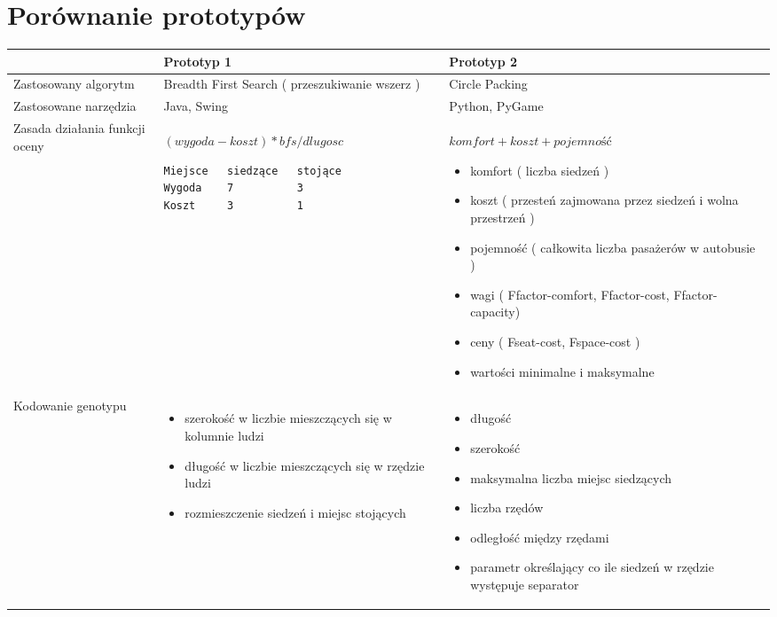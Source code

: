 \documentclass[bibtotocnumbered, headsepline,normalheadings,12pt,polish]{scrreprt}
\begin{document}
\chapter*{Porównanie prototypów}
\begin{tabular}{| p{3cm} || p{6cm} | p{6cm} |}
\hline
 & Prototyp 1 & Prototyp 2 \\
\hline
\hline
Zastosowany algorytm & Breadth First Search ( przeszukiwanie wszerz ) & Circle Packing \\
\hline
Zastosowane narzędzia & Java, Swing & Python, PyGame \\
\hline

Zasada działania funkcji oceny &
$ (wygoda-koszt)*bfs/dlugosc $
\begin{verbatim}
Miejsce   siedzące   stojące
Wygoda    7          3
Koszt     3          1
\end{verbatim}
&
$ komfort + koszt + pojemność $
\begin{itemize}
\item komfort ( liczba siedzeń )
\item koszt ( przesteń zajmowana przez siedzeń i wolna przestrzeń )
\item pojemność ( całkowita liczba pasażerów w autobusie )
\item wagi  ( Ffactor-comfort, Ffactor-cost, Ffactor-capacity)
\item ceny ( Fseat-cost, Fspace-cost )
\item wartości minimalne i maksymalne
\end{itemize}
\\
\hline
Kodowanie genotypu & \begin{itemize}
    \item szerokość w liczbie mieszczących się w kolumnie ludzi
    \item  długość w liczbie mieszczących się w rzędzie ludzi
    \item rozmieszczenie siedzeń i miejsc stojących
\end{itemize}
&
\begin{itemize}
    \item długość
    \item szerokość
    \item maksymalna liczba miejsc siedzących
    \item liczba rzędów
    \item odległość między rzędami
    \item parametr określający co ile siedzeń w rzędzie występuje separator
\end{itemize}
\\
\hline
\end{tabular}
\end{document}
